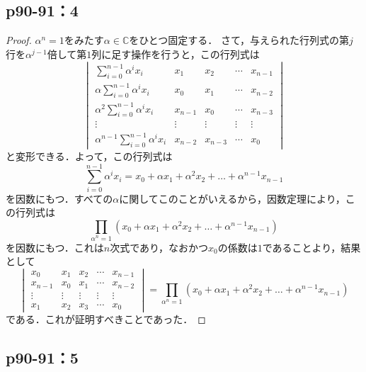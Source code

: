 \documentclass[uplatex,dvipdfmx,a4paper,11pt,fleqn]{jsarticle}
\begin{document}
\newpage 


\subsection*{p90-91：4}

\begin{leftbar}
    \begin{proof}
    $\alpha ^n =1$をみたす$\alpha \in \mathbb{C}$をひとつ固定する．
    さて，与えられた行列式の第$j$行を$\alpha^{j-1}$倍して第$1$列に足す操作を行うと，この行列式は
    \[
        \begin{vmatrix}
            \sum_{i=0}^{n-1} \alpha^i x_i & x_1 & x_2 & \cdots & x_{n-1} \\
            \alpha \sum_{i=0}^{n-1} \alpha^i x_i & x_0 & x_1 & \cdots & x_{n-2} \\
            \alpha^2 \sum_{i=0}^{n-1} \alpha^i x_i & x_{n-1} & x_0 & \cdots & x_{n-3} \\
            \vdots & \vdots & \vdots & \vdots & \vdots  \\
            \alpha^{n-1} \sum_{i=0}^{n-1} \alpha^i x_i & x_{n-2} & x_{n-3} & \cdots & x_0 
        \end{vmatrix}
    \]
    と変形できる．よって，この行列式は
    \[
        \sum_{i=0}^{n-1} \alpha^i x_i = x_0 + \alpha x_1 + \alpha^2 x_2 + \dots +\alpha^{n-1} x_{n-1}
    \]
    を因数にもつ．すべての$\alpha$に関してこのことがいえるから，因数定理により，この行列式は
    \[
        \prod_{\alpha^n=1} (x_0 + \alpha x_1 + \alpha^2 x_2 + \dots +\alpha^{n-1} x_{n-1})
    \]
を因数にもつ．これは$n$次式であり，なおかつ$x_0$の係数は$1$であることより，結果として
\[
   \begin{vmatrix} 
    x_0 & x_1 & x_2 & \cdots & x_{n-1} \\
    x_{n-1} & x_0 & x_1 & \cdots & x_{n-2} \\
    \vdots & \vdots & \vdots & \vdots & \vdots \\
    x_1 & x_2 & x_3 & \cdots & x_0 
   \end{vmatrix} 
   =  \prod_{\alpha^n=1} (x_0 + \alpha x_1 + \alpha^2 x_2 + \dots +\alpha^{n-1} x_{n-1})
\]
である．これが証明すべきことであった．
\end{proof}
\end{leftbar}


\subsection*{p90-91：5}
\end{document}
